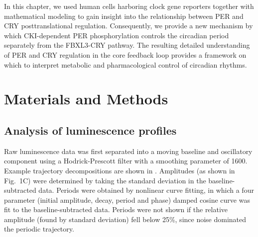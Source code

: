 In this chapter, we used human cells harboring clock gene reporters together with mathematical modeling to gain insight into the relationship between PER and CRY posttranslational regulation. 
Consequently, we provide a new mechanism by which CKI-dependent PER phosphorylation controls the circadian period separately from the FBXL3-CRY pathway. 
The resulting detailed understanding of PER and CRY regulation in the core feedback loop provides a framework on which to interpret metabolic and pharmacological control of circadian rhythms.

\section{Materials and Methods}
\subsection{Analysis of luminescence profiles}
Raw luminescence data was first separated into a moving baseline and oscillatory component using a Hodrick-Prescott filter with a smoothing parameter of 1600. 
Example trajectory decompositions are shown in . 
Amplitudes (as shown in Fig.~1C) were determined by taking the standard deviation in the baseline-subtracted data. 
Periods were obtained by nonlinear curve fitting, in which a four parameter (initial amplitude, decay, period and phase) damped cosine curve was fit to the baseline-subtracted data. 
Periods were not shown if the relative amplitude (found by standard deviation) fell below 25\%, since noise dominated the periodic trajectory. 

